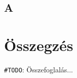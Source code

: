 \documentclass[tocnopagenum]{thesis-ekf}
\newtheorem{tetel}{Tétel}[chapter]
\theoremstyle{definition}
\newtheorem{definicio}[tetel]{Definíció}
\theoremstyle{remark}
\newtheorem{megjegyzes}[tetel]{Megjegyzés}
\begin{document}
	\section{A}

	\begin{comment}
		Ezek később lesznek hasznosak
		\begin{tetel}
			Tétel szövege.
		\end{tetel}
		
		\begin{proof}
			Bizonyítás szövege.
		\end{proof}
		
		\begin{definicio}
			Definíció szövege.
		\end{definicio}
		
		\begin{megjegyzes}
			Megjegyzés szövege.
		\end{megjegyzes}
	\end{comment}
	
	\chapter*{Összegzés}
	\verb*|#TODO|: Összefoglalás...
	
	
	
\end{document}
